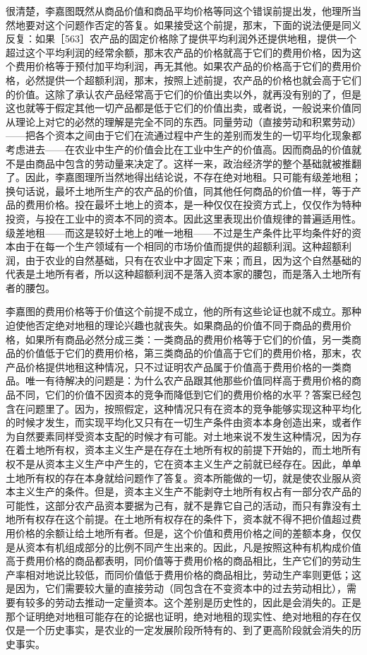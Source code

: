 很清楚，李嘉图既然从商品价值和商品平均价格等同这个错误前提出发，他理所当然地要对这个问题作否定的答复。如果接受这个前提，那末，下面的说法便是同义反复：如果［563］农产品的固定价格除了提供平均利润外还提供地租，提供一个超过这个平均利润的经常余额，那末农产品的价格就高于它们的费用价格，因为这个费用价格等于预付加平均利润，再无其他。如果农产品的价格高于它们的费用价格，必然提供一个超额利润，那末，按照上述前提，农产品的价格也就会高于它们的价值。这除了承认农产品经常高于它们的价值出卖以外，就再没有别的了，但是这也就等于假定其他一切产品都是低于它们的价值出卖，或者说，一般说来价值同从理论上对它的必然的理解是完全不同的东西。同量劳动（直接劳动和积累劳动）——把各个资本之间由于它们在流通过程中产生的差别而发生的一切平均化现象都考虑进去——在农业中生产的价值会比在工业中生产的价值高。因而商品的价值就不是由商品中包含的劳动量来决定了。这样一来，政治经济学的整个基础就被推翻了。因此，李嘉图理所当然地得出结论说，不存在绝对地租。只可能有级差地租；换句话说，最坏土地所生产的农产品的价值，同其他任何商品的价值一样，等于产品的费用价格。投在最坏土地上的资本，是一种仅仅在投资方式上，仅仅作为特种投资，与投在工业中的资本不同的资本。因此这里表现出价值规律的普遍适用性。级差地租——而这是较好土地上的唯一地租——不过是生产条件比平均条件好的资本由于在每一个生产领域有一个相同的市场价值而提供的超额利润。这种超额利润，由于农业的自然基础，只有在农业中才固定下来；而且，因为这个自然基础的代表是土地所有者，所以这种超额利润不是落入资本家的腰包，而是落入土地所有者的腰包。

李嘉图的费用价格等于价值这个前提不成立，他的所有这些论证也就不成立。那种迫使他否定绝对地租的理论兴趣也就丧失。如果商品的价值不同于商品的费用价格，如果所有商品必然分成三类：一类商品的费用价格等于它们的价值，另一类商品的价值低于它们的费用价格，第三类商品的价值高于它们的费用价格，那末，农产品价格提供地租这种情况，只不过证明农产品属于价值高于费用价格的一类商品。唯一有待解决的问题是：为什么农产品跟其他那些价值同样高于费用价格的商品不同，它们的价值不因资本的竞争而降低到它们的费用价格的水平？答案已经包含在问题里了。因为，按照假定，这种情况只有在资本的竞争能够实现这种平均化的时候才发生，而实现平均化又只有在一切生产条件由资本本身创造出来，或者作为自然要素同样受资本支配的时候才有可能。对土地来说不发生这种情况，因为存在着土地所有权，资本主义生产是在存在土地所有权的前提下开始的，而土地所有权不是从资本主义生产中产生的，它在资本主义生产之前就已经存在。因此，单单土地所有权的存在本身就给问题作了答复。资本所能做的一切，就是使农业服从资本主义生产的条件。但是，资本主义生产不能剥夺土地所有权占有一部分农产品的可能性，这部分农产品资本要据为己有，就不是靠它自己的活动，而只有靠没有土地所有权存在这个前提。在土地所有权存在的条件下，资本就不得不把价值超过费用价格的余额让给土地所有者。但是，这个价值和费用价格之间的差额本身，仅仅是从资本有机组成部分的比例不同产生出来的。因此，凡是按照这种有机构成价值高于费用价格的商品都表明，同价值等于费用价格的商品相比，生产它们的劳动生产率相对地说比较低，而同价值低于费用价格的商品相比，劳动生产率则更低；这是因为，它们需要较大量的直接劳动（同包含在不变资本中的过去劳动相比），需要有较多的劳动去推动一定量资本。这个差别是历史性的，因此是会消失的。正是那个证明绝对地租可能存在的论据也证明，绝对地租的现实性、绝对地租的存在仅仅是一个历史事实，是农业的一定发展阶段所特有的、到了更高阶段就会消失的历史事实。


